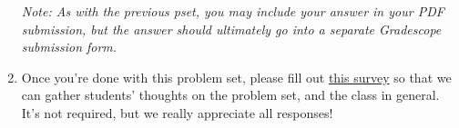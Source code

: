\documentclass[11pt]{article}
\begin{document}
\begin{enumerate}
\textit{Note: As with the previous pset, you may include your answer in your PDF submission, but the answer should ultimately go into a separate Gradescope submission form.}

\item Once you're done with this problem set, please fill out \href{https://forms.gle/d19XKrLUdaJhYzvH8}{this survey} so that we can gather students' thoughts on the problem set, and the class in general. It's not required, but we really appreciate all responses!
\end{enumerate}
\end{document}
